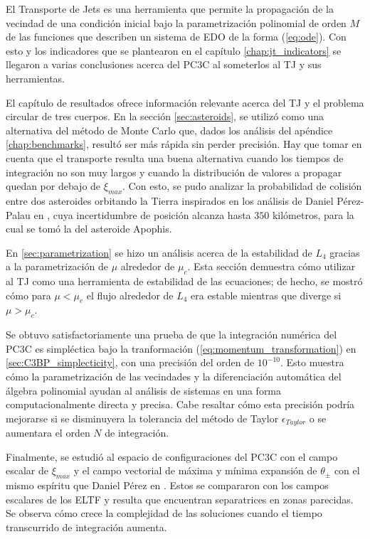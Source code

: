 El Transporte de Jets es una herramienta que permite la propagación de la vecindad de una condición inicial bajo la parametrización polinomial de orden $M$ de las funciones que describen un sistema de EDO de la forma (\ref{eq:ode}). Con esto y los indicadores que se plantearon en el capítulo \ref{chap:jt_indicators} se llegaron a varias conclusiones acerca del PC3C al someterlos al TJ y sus herramientas.

El capítulo de resultados ofrece información relevante acerca del TJ y el problema circular de tres cuerpos. En la sección \ref{sec:asteroids}, se utilizó como una alternativa del método de Monte Carlo que, dados los análisis del apéndice \ref{chap:benchmarks}, resultó ser más rápida sin perder precisión. Hay que tomar en cuenta que el transporte resulta una buena alternativa cuando los tiempos de integración no son muy largos y cuando la distribución de valores a propagar quedan por debajo de $\xi_{max}$. Con esto, se pudo analizar la probabilidad de colisión entre dos asteroides orbitando la Tierra inspirados en los análisis de Daniel Pérez-Palau en \cite{Perez2013}, cuya incertidumbre de posición alcanza hasta $350$ kilómetros, para la cual se tomó la del asteroide Apophis. 

En \ref{sec:parametrization} se hizo un análisis acerca de la estabilidad de $L_4$ gracias a la parametrización de $\mu$ alrededor de $\mu_c$. Esta sección demuestra cómo utilizar al TJ como una herramienta de estabilidad de las ecuaciones; de hecho, se mostró cómo para $\mu < \mu_c$ el flujo alrededor de $L_4$ era estable mientras que diverge si $\mu > \mu_c$. 

Se obtuvo satisfactoriamente una prueba de que la integración numérica del PC3C es simpléctica bajo la tranformación (\ref{eq:momentum_transformation}) en \ref{sec:C3BP_simplecticity}, con una precisión del orden de $10^{-10}$. Esto muestra cómo la parametrización de las vecindades y la diferenciación automática del álgebra polinomial ayudan al análisis de sistemas en una forma computacionalmente directa y precisa. Cabe resaltar cómo esta precisión podría mejorarse si se disminuyera la tolerancia del método de Taylor $\epsilon_{Taylor}$ o se aumentara el orden $N$ de integración.

Finalmente, se estudió al espacio de configuraciones del PC3C con el campo escalar de $\xi_{max}$ y el campo vectorial de máxima y mínima expansión de $\theta_{\pm}$ con el mismo espíritu que Daniel Pérez en \cite{Perez2015}. Estos se compararon con los campos escalares de los ELTF y resulta que encuentran separatrices en zonas parecidas. Se observa cómo crece la complejidad de las soluciones cuando el tiempo transcurrido de integración aumenta.


